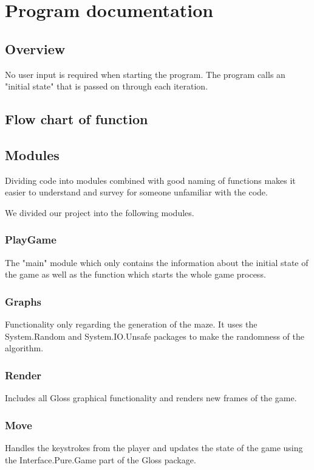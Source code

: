 \documentclass[12pt, a4paper]{article}
\begin{document}
\newpage
\section{Program documentation}

\subsection{Overview}
No user input is required when starting the program. The program calls an "initial state" that is passed on through each iteration. 

\subsection{Flow chart of function}


\subsection{Modules}
Dividing code into modules combined with good naming of functions makes it easier to understand and survey for someone unfamiliar with the code.

We divided our project into the following modules.

\subsubsection*{PlayGame}
The "main" module which only contains the information about the initial state of the game as well as the function which starts the whole game process.

\subsubsection*{Graphs}
Functionality only regarding the generation of the maze. It uses the System.Random and System.IO.Unsafe packages to make the randomness of the algorithm.

\subsubsection*{Render}
Includes all Gloss graphical functionality and renders new frames of the game.

\subsubsection*{Move}
Handles the keystrokes from the player and updates the state of the game using the Interface.Pure.Game part of the Gloss package.
\end{document}

